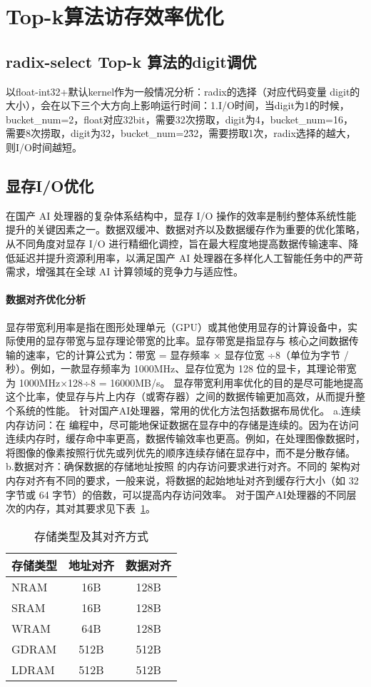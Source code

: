\section{Top-k算法访存效率优化}
\subsection{radix-select Top-k 算法的digit调优}

以float-int32+默认kernel作为一般情况分析：radix的选择（对应代码变量
digit的大小），会在以下三个大方向上影响运行时间：1.I/O时间，当digit为1的时候，
bucket\_num=2，float对应32bit，需要32次捞取，digit为4，bucket\_num=16，
需要8次捞取，digit为32，bucket\_num=2\^32，需要捞取1次，radix选择的越大，
则I/O时间越短。

\subsection{显存I/O优化}
在国产 AI 处理器的复杂体系结构中，显存 I/O 操作的效率是制约整体系统性能提升的关键因素之一。数据双缓冲、数据对齐以及数据缓存作为重要的优化策略，从不同角度对显存 I/O 进行精细化调控，旨在最大程度地提高数据传输速率、降低延迟并提升资源利用率，以满足国产 AI 处理器在多样化人工智能任务中的严苛需求，增强其在全球 AI 计算领域的竞争力与适应性。


\paragraph{数据对齐优化分析}

显存带宽利用率是指在图形处理单元（GPU）或其他使用显存的计算设备中，实际使用的显存带宽与显存理论带宽的比率。显存带宽是指显存与 核心之间数据传输的速率，它的计算公式为：带宽 = 显存频率 × 显存位宽 ÷8（单位为字节 / 秒）。例如，一款显存频率为 1000MHz、显存位宽为 128 位的显卡，其理论带宽为 1000MHz×128÷8 = 16000MB/s。
显存带宽利用率优化的目的是尽可能地提高这个比率，使显存与片上内存（或寄存器）之间的数据传输更加高效，从而提升整个系统的性能。
针对国产AI处理器，常用的优化方法包括数据布局优化。
a.连续内存访问：在 编程中，尽可能地保证数据在显存中的存储是连续的。因为在访问连续内存时，缓存命中率更高，数据传输效率也更高。例如，在处理图像数据时，将图像的像素按照行优先或列优先的顺序连续存储在显存中，而不是分散存储。
b.数据对齐：确保数据的存储地址按照 的内存访问要求进行对齐。不同的 架构对内存对齐有不同的要求，一般来说，将数据的起始地址对齐到缓存行大小（如 32 字节或 64 字节）的倍数，可以提高内存访问效率。
对于国产AI处理器的不同层次的内存，其对其要求见下表~\ref{tab:alignment}。

\begin{table}
    \centering
    \begin{tabular}{lcc}
    \toprule
    存储类型 & 地址对齐 & 数据对齐 \\
    \midrule
    NRAM & 16B & 128B \\
    SRAM & 16B & 128B \\
    WRAM & 64B & 128B \\
    GDRAM & 512B & 512B \\
    LDRAM & 512B & 512B \\
    \bottomrule
    \end{tabular}
    \caption{存储类型及其对齐方式}
    \label{tab:alignment}
    \end{table}

